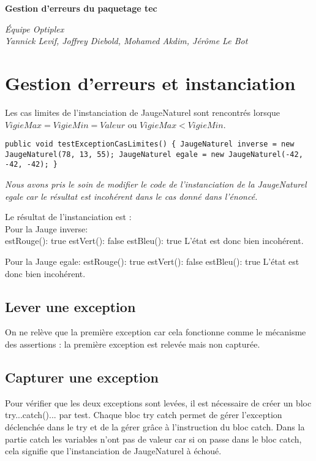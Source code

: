 \documentclass[11pt,a4paper]{article}
\begin{document}
\begin{center}
\huge{\textbf{Gestion d’erreurs du paquetage tec}}
\end{center}

\begin{flushleft}
\emph{\'Equipe Optiplex \\ Yannick Levif, Joffrey Diebold, Mohamed Akdim, Jérôme Le Bot}
\end{flushleft}
\section{Gestion d’erreurs et instanciation}

Les cas limites de l'instanciation de JaugeNaturel sont rencontrés lorsque $VigieMax = VigieMin = Valeur$ ou $VigieMax < VigieMin$.\\

\begin{verbatim}
public void testExceptionCasLimites() { JaugeNaturel inverse = new JaugeNaturel(78, 13, 55); JaugeNaturel egale = new JaugeNaturel(-42, -42, -42); }
\end{verbatim}

\textit{Nous avons pris le soin de modifier le code de l'instanciation de la JaugeNaturel egale car le résultat est incohérent dans le cas donné dans l'énoncé.}

Le résultat de l'instanciation est : \\
Pour la Jauge inverse: \\
estRouge(): true
estVert(): false
estBleu(): true
L'état est donc bien incohérent.

Pour la Jauge egale:
estRouge(): true
estVert(): false
estBleu(): true
L'état est donc bien incohérent.

\subsection{Lever une exception}

On ne relève que la première exception car cela fonctionne comme le mécanisme des assertions : la première exception est relevée mais non capturée.

\subsection{Capturer une exception}

Pour vérifier que les deux exceptions sont levées, il est nécessaire de créer un bloc try{...}catch(){...} par test.
Chaque bloc try catch permet de gérer l'exception déclenchée dans le try et de la gérer grâce à l'instruction du bloc catch.
Dans la partie catch les variables n'ont pas de valeur car si on passe dans le bloc catch, cela signifie que l'instanciation de JaugeNaturel à échoué.  
\end{document}
